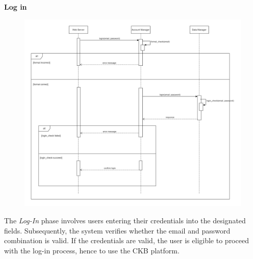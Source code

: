 \documentclass[../DD.tex]{subfiles}
\begin{document}
    \textbf{Log in}\\
    \begin{figure}[H]
        \centering
        \hspace*{-3cm}
        \includegraphics[width=1.35\textwidth]{../assets/section_2/login.png}
    \end{figure}
    The \textit{Log-In} phase involves users entering their credentials into the designated fields.
    Subsequently, the system verifies whether the email and password combination is valid.
    If the credentials are valid, the user is eligible to proceed with the log-in process, hence to use the CKB platform.
    \newpage
\end{document}
